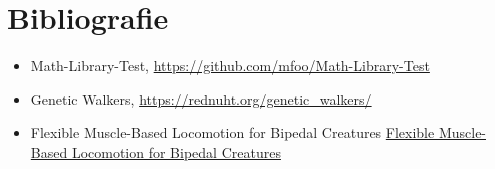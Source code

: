 \chapter*{Bibliografie} 

\begin{itemize}
    \item Math-Library-Test, \url{https://github.com/mfoo/Math-Library-Test}
    \item Genetic Walkers, \url{https://rednuht.org/genetic_walkers/}
    \item Flexible Muscle-Based Locomotion for Bipedal Creatures \url {Flexible Muscle-Based Locomotion for Bipedal Creatures}
\end{itemize}